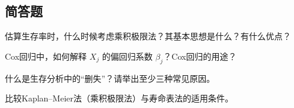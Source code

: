\par\addvspace{8pt}\noindent\begin{minipage}{\linewidth}

\subsection{简答题}


估算生存率时，什么时候考虑乘积极限法？其基本思想是什么？有什么优点？



\end{minipage}\par\vspace{5pt}

\par\addvspace{8pt}\noindent\begin{minipage}{\linewidth}


Cox回归中，如何解释 \(X_j\) 的偏回归系数 \(\beta_j\)？Cox回归的用途？



\end{minipage}\par\vspace{5pt}

\par\addvspace{8pt}\noindent\begin{minipage}{\linewidth}


什么是生存分析中的``删失''？请举出至少三种常见原因。



\end{minipage}\par\vspace{5pt}

\par\addvspace{8pt}\noindent\begin{minipage}{\linewidth}


比较Kaplan--Meier法（乘积极限法）与寿命表法的适用条件。



\end{minipage}\par\vspace{5pt}

